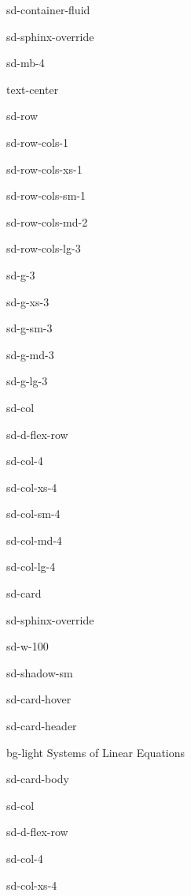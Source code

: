 \documentclass[letterpaper,10pt,english]{jupyterBook}
\let\sphinxpxdimen\pdfpxdimen\else\newdimen\sphinxpxdimen
\begin{document}
\begin{sphinxuseclass}{sd-container-fluid}
\begin{sphinxuseclass}{sd-sphinx-override}
\begin{sphinxuseclass}{sd-mb-4}
\begin{sphinxuseclass}{text-center}
\begin{sphinxuseclass}{sd-row}
\begin{sphinxuseclass}{sd-row-cols-1}
\begin{sphinxuseclass}{sd-row-cols-xs-1}
\begin{sphinxuseclass}{sd-row-cols-sm-1}
\begin{sphinxuseclass}{sd-row-cols-md-2}
\begin{sphinxuseclass}{sd-row-cols-lg-3}
\begin{sphinxuseclass}{sd-g-3}
\begin{sphinxuseclass}{sd-g-xs-3}
\begin{sphinxuseclass}{sd-g-sm-3}
\begin{sphinxuseclass}{sd-g-md-3}
\begin{sphinxuseclass}{sd-g-lg-3}
\begin{sphinxuseclass}{sd-col}
\begin{sphinxuseclass}{sd-d-flex-row}
\begin{sphinxuseclass}{sd-col-4}
\begin{sphinxuseclass}{sd-col-xs-4}
\begin{sphinxuseclass}{sd-col-sm-4}
\begin{sphinxuseclass}{sd-col-md-4}
\begin{sphinxuseclass}{sd-col-lg-4}
\begin{sphinxuseclass}{sd-card}
\begin{sphinxuseclass}{sd-sphinx-override}
\begin{sphinxuseclass}{sd-w-100}
\begin{sphinxuseclass}{sd-shadow-sm}
\begin{sphinxuseclass}{sd-card-hover}
\begin{sphinxuseclass}{sd-card-header}
\begin{sphinxuseclass}{bg-light}
\sphinxAtStartPar
Systems of Linear Equations

\end{sphinxuseclass}
\end{sphinxuseclass}
\begin{sphinxuseclass}{sd-card-body}
\begin{figure}[htbp]
\centering

\noindent\sphinxincludegraphics[width=250\sphinxpxdimen]{{2_consistent_systems}.png}
\end{figure}

\end{sphinxuseclass}{\hyperref[\detokenize{_pages/2.0_Linear_systems::doc}]{}}
\end{sphinxuseclass}
\end{sphinxuseclass}
\end{sphinxuseclass}
\end{sphinxuseclass}
\end{sphinxuseclass}
\end{sphinxuseclass}
\end{sphinxuseclass}
\end{sphinxuseclass}
\end{sphinxuseclass}
\end{sphinxuseclass}
\end{sphinxuseclass}
\end{sphinxuseclass}
\begin{sphinxuseclass}{sd-col}
\begin{sphinxuseclass}{sd-d-flex-row}
\begin{sphinxuseclass}{sd-col-4}
\begin{sphinxuseclass}{sd-col-xs-4}

\end{sphinxuseclass}
\end{sphinxuseclass}
\end{sphinxuseclass}
\end{sphinxuseclass}
\end{sphinxuseclass}
\end{sphinxuseclass}
\end{sphinxuseclass}
\end{sphinxuseclass}
\end{sphinxuseclass}
\end{sphinxuseclass}
\end{sphinxuseclass}
\end{sphinxuseclass}
\end{sphinxuseclass}
\end{sphinxuseclass}
\end{sphinxuseclass}
\end{sphinxuseclass}
\end{sphinxuseclass}
\end{sphinxuseclass}
\end{sphinxuseclass}
\end{document}
